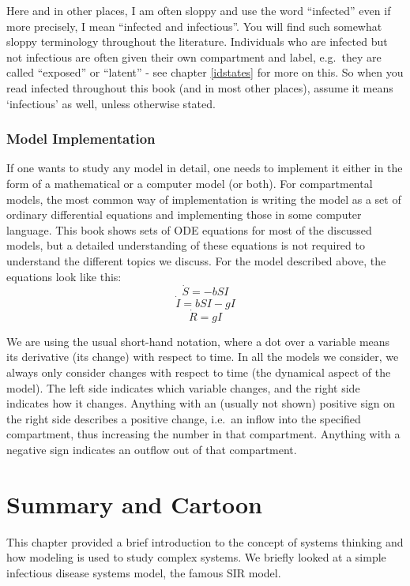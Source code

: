 \documentclass[]{book}
\theoremstyle{definition}
\theoremstyle{definition}
\theoremstyle{definition}
\theoremstyle{remark}
\begin{document}
Here and in other places, I am often sloppy and use the word
``infected'' even if more precisely, I mean ``infected and infectious''.
You will find such somewhat sloppy terminology throughout the
literature. Individuals who are infected but not infectious are often
given their own compartment and label, e.g.~they are called ``exposed''
or ``latent'' - see chapter \ref{idstates} for more on this. So when you
read infected throughout this book (and in most other places), assume it
means `infectious' as well, unless otherwise stated.

\subsubsection{Model Implementation}\label{myadvancedbox}

If one wants to study any model in detail, one needs to implement it
either in the form of a mathematical or a computer model (or both). For
compartmental models, the most common way of implementation is writing
the model as a set of ordinary differential equations and implementing
those in some computer language. This book shows sets of ODE equations
for most of the discussed models, but a detailed understanding of these
equations is not required to understand the different topics we discuss.
For the model described above, the equations look like this:
\[\dot S = -bSI\] \[\dot I = bSI - gI\] \[\dot R = gI\]

We are using the usual short-hand notation, where a dot over a variable
means its derivative (its change) with respect to time. In all the
models we consider, we always only consider changes with respect to time
(the dynamical aspect of the model). The left side indicates which
variable changes, and the right side indicates how it changes. Anything
with an (usually not shown) positive sign on the right side describes a
positive change, i.e.~an inflow into the specified compartment, thus
increasing the number in that compartment. Anything with a negative sign
indicates an outflow out of that compartment.

\section{Summary and Cartoon}\label{summary-and-cartoon}

This chapter provided a brief introduction to the concept of systems
thinking and how modeling is used to study complex systems. We briefly
looked at a simple infectious disease systems model, the famous SIR
model.
\end{document}
